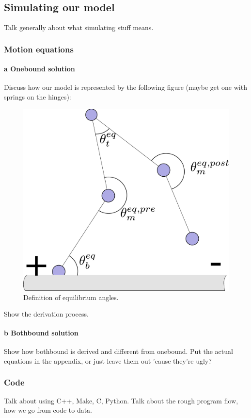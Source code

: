 \documentclass[10pt]{article} %
\begin{document}
\subsection{Simulating our model}
Talk generally about what simulating stuff means.\\
\subsubsection{Motion equations}

\paragraph{a Onebound solution}
Discuss how our model is represented by the following figure (maybe get one with springs on the
hinges):\\

\begin{figure}
  \centering
  \includegraphics[width=.45\textwidth]{../figures/equilibrium-onebound}
  \caption{Definition of equilibrium angles.}
  \label{fig:eq_angles}
\end{figure}

Show the derivation process.\\

\paragraph{b Bothbound solution}
Show how bothbound is derived and different from onebound. Put the actual equations in the appendix,
or just leave them out 'cause they're ugly?\\

\subsubsection{Code}
Talk about using C++, Make, C, Python. Talk about the rough program flow, how we go from code to
data.\\
\end{document}
